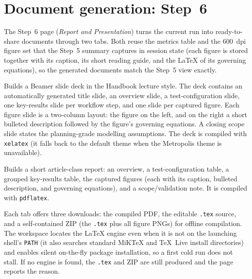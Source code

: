 \documentclass[11pt,a4paper,openany]{book}
\providecommand{\SI}[2]{\qty{#1}{#2}}
\theoremstyle{handbook}
\begin{document}
\section{Document generation: Step~6}\label{sec:docgen}

The Step~6 page (\emph{Report and Presentation}) turns the current run into
ready-to-share documents through two tabs. Both reuse the metrics table and the
\SI{600}{dpi} figure set that the Step~5 summary captures in session state (each
figure is stored together with its caption, its short reading guide, and the
\LaTeX{} of its governing equations), so the generated documents match the
Step~5 view exactly.

\begin{description}[leftmargin=2em,style=nextline]
  \item[Presentation tab] Builds a Beamer slide deck in the Handbook
    lecture style. The deck contains an automatically generated title slide,
    an overview slide, a test-configuration slide, one key-results slide per
    workflow step, and one slide per captured figure. Each figure slide is a
    two-column layout: the figure on the left, and on the right a short
    bulleted description followed by the figure's governing equations. A
    closing scope slide states the planning-grade modelling assumptions. The
    deck is compiled with \texttt{xelatex} (it falls back to the default theme
    when the Metropolis theme is unavailable).
  \item[Report tab] Builds a short article-class report: an overview, a
    test-configuration table, a grouped key-results table, the captured
    figures (each with its caption, bulleted description, and governing
    equations), and a scope/validation note. It is compiled with
    \texttt{pdflatex}.
\end{description}

Each tab offers three downloads: the compiled PDF, the editable \texttt{.tex}
source, and a self-contained ZIP (the \texttt{.tex} plus all figure PNGs) for
offline compilation. The workspace locates the \LaTeX{} engine even when it is
not on the launching shell's \texttt{PATH} (it also searches standard MiKTeX
and TeX~Live install directories) and enables silent on-the-fly package
installation, so a first cold run does not stall. If no engine is found, the
\texttt{.tex} and ZIP are still produced and the page reports the reason.


\appendix
\end{document}
